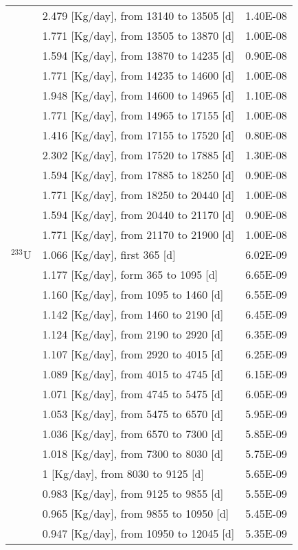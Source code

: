 \begin{table}[ht!]
\begin{tabularx}{\textwidth}{|p{1.5cm}|b|p{1.9cm}|}
		&  2.479  [Kg/day], from 13140 to 13505 [d]&		1.40E-08	 \\
		&  1.771 [Kg/day], from 13505 to 13870 [d]&		1.00E-08	 \\
		& 1.594   [Kg/day], from 13870 to 14235 [d]&		0.90E-08	 \\
		&  1.771   [Kg/day], from 14235 to 14600 [d]&		1.00E-08	 \\
		& 1.948  [Kg/day], from 14600 to 14965 [d]&		1.10E-08	 \\
		&  1.771   [Kg/day], from 14965 to 17155 [d]&		1.00E-08	 \\
		&  1.416  [Kg/day], from 17155 to 17520 [d]&		0.80E-08	 \\
		&  2.302  [Kg/day], from 17520 to 17885 [d]&		1.30E-08	 \\
		& 1.594  [Kg/day], from 17885 to 18250 [d]&		0.90E-08	 \\
		&   1.771 [Kg/day], from 18250 to 20440 [d]&		1.00E-08	 \\
		&  1.594  [Kg/day], from 20440 to 21170 [d]&		0.90E-08	 \\
		&  1.771 [Kg/day], from 21170 to 21900 [d]&		1.00E-08	 \\
		\hline
		$^{233}$U &  1.066 [Kg/day], first 365  [d]	&   6.02E-09  \\
		& 1.177 [Kg/day],  form 365 to 1095 [d] &	6.65E-09 \\
		&  1.160 [Kg/day], from 1095 to 1460 [d] &	6.55E-09 \\
		& 1.142   [Kg/day], from 1460 to 2190 [d] &	6.45E-09 \\
		& 1.124  [Kg/day], from 2190 to 2920 [d] &	6.35E-09 \\
		& 1.107 [Kg/day], from 2920 to 4015 [d] &	6.25E-09 \\
		&  1.089 [Kg/day], from 4015 to 4745 [d] &	6.15E-09 \\
		&  1.071  [Kg/day], from 4745 to 5475 [d] &	6.05E-09 \\
		& 1.053  [Kg/day], from 5475 to 6570 [d] &	5.95E-09 \\
		&  1.036  [Kg/day], from 6570 to 7300 [d] &	5.85E-09 \\
		&  1.018   [Kg/day], from 7300 to 8030 [d] &	5.75E-09 \\
		&  1   [Kg/day], from 8030 to 9125 [d] &	5.65E-09 \\
		&  0.983 [Kg/day], from 9125 to 9855 [d] &	5.55E-09 \\
		&  0.965  [Kg/day], from 9855 to 10950 [d] &	5.45E-09 \\
		&   0.947  [Kg/day], from 10950 to 12045 [d] &	5.35E-09 \\

\end{tabularx}
\end{table}
